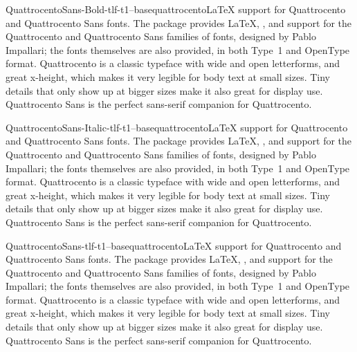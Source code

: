 \documentclass{ddltxtyp}
\begin{document}
\begin{package}{QuattrocentoSans-Bold-tlf-t1--base}{quattrocento}{{\LaTeX} support for Quattrocento and Quattrocento Sans fonts.}
The package provides {\LaTeX}, {\pdfLaTeX}, {\XeLaTeX} and {\LuaLaTeX}
support for the Quattrocento and Quattrocento Sans families of
fonts, designed by Pablo Impallari; the fonts themselves are
also provided, in both Type~1 and OpenType format. Quattrocento
is a classic typeface with wide and open letterforms, and great
x-height, which makes it very legible for body text at small
sizes. Tiny details that only show up at bigger sizes make it
also great for display use. Quattrocento Sans is the perfect
sans-serif companion for Quattrocento.
\end{package}
\begin{package}{QuattrocentoSans-Italic-tlf-t1--base}{quattrocento}{{\LaTeX} support for Quattrocento and Quattrocento Sans fonts.}
The package provides {\LaTeX}, {\pdfLaTeX}, {\XeLaTeX} and {\LuaLaTeX}
support for the Quattrocento and Quattrocento Sans families of
fonts, designed by Pablo Impallari; the fonts themselves are
also provided, in both Type~1 and OpenType format. Quattrocento
is a classic typeface with wide and open letterforms, and great
x-height, which makes it very legible for body text at small
sizes. Tiny details that only show up at bigger sizes make it
also great for display use. Quattrocento Sans is the perfect
sans-serif companion for Quattrocento.
\end{package}
\begin{package}{QuattrocentoSans-tlf-t1--base}{quattrocento}{{\LaTeX} support for Quattrocento and Quattrocento Sans fonts.}
The package provides {\LaTeX}, {\pdfLaTeX}, {\XeLaTeX} and {\LuaLaTeX}
support for the Quattrocento and Quattrocento Sans families of
fonts, designed by Pablo Impallari; the fonts themselves are
also provided, in both Type~1 and OpenType format. Quattrocento
is a classic typeface with wide and open letterforms, and great
x-height, which makes it very legible for body text at small
sizes. Tiny details that only show up at bigger sizes make it
also great for display use. Quattrocento Sans is the perfect
sans-serif companion for Quattrocento.
\end{package}
\end{document}
